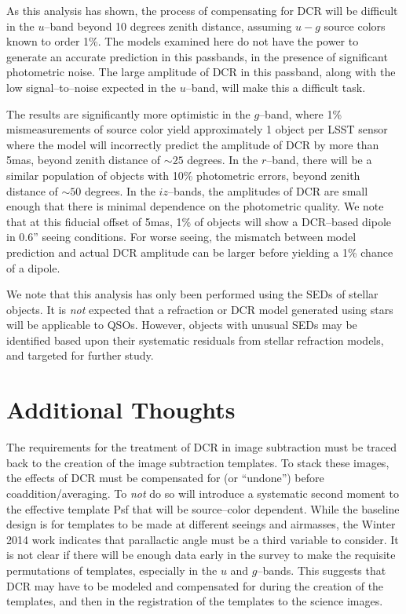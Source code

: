 \documentclass[DM,toc]{lsstdoc}
\begin{document}
As this analysis has shown, the process of compensating for DCR will
be difficult in the $u$--band beyond 10 degrees zenith distance,
assuming $u-g$ source colors known to order 1\%.  The models examined
here do not have the power to generate an accurate prediction in this
passbands, in the presence of significant photometric noise.  The
large amplitude of DCR in this passband, along with the low
signal--to--noise expected in the $u$--band, will make this a
difficult task.

The results are significantly more optimistic in the $g$--band, where
1\% mismeasurements of source color yield approximately 1 object per
LSST sensor where the model will incorrectly predict the amplitude of
DCR by more than 5mas, beyond zenith distance of $\sim 25$ degrees.
In the $r$--band, there will be a similar population of objects with
10\% photometric errors, beyond zenith distance of $\sim 50$ degrees.
In the $iz$--bands, the amplitudes of DCR are small enough that there
is minimal dependence on the photometric quality.  We note that at
this fiducial offset of 5mas, 1\% of objects will show a DCR--based
dipole in 0.6'' seeing conditions.  For worse seeing, the mismatch
between model prediction and actual DCR amplitude can be larger before
yielding a 1\% chance of a dipole.

We note that this analysis has only been performed using the SEDs of
stellar objects.  It is {\it not} expected that a refraction or DCR
model generated using stars will be applicable to QSOs.  However,
objects with unusual SEDs may be identified based upon their
systematic residuals from stellar refraction models, and targeted for
further study.

\section{Additional Thoughts}

The requirements for the treatment of DCR in image subtraction must be
traced back to the creation of the image subtraction templates.  To
stack these images, the effects of DCR must be compensated for (or
``undone'') before coaddition/averaging.  To {\it not} do so will
introduce a systematic second moment to the effective template Psf
that will be source--color dependent.  While the baseline design is
for templates to be made at different seeings and airmasses, the
Winter 2014 work indicates that parallactic angle must be a third
variable to consider.  It is not clear if there will be enough data
early in the survey to make the requisite permutations of templates,
especially in the $u$ and $g$--bands.  This suggests that DCR may have
to be modeled and compensated for during the creation of the
templates, and then in the registration of the templates to the
science images.
\end{document}
